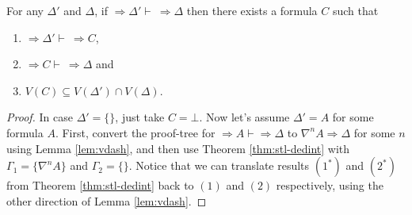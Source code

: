 \begin{cor}\label{cor:stl-dedint} For any $\Delta'$ and $\Delta$, if $\Rightarrow \Delta' \vdash\ \Rightarrow \Delta$ then there exists a formula $C$ such that
	\begin{enumerate}[label=(\arabic*)]
		\item $\Rightarrow \Delta' \vdash\ \Rightarrow C$,
		\item $\Rightarrow C \vdash\ \Rightarrow \Delta$ and
		\item $V(C) \subseteq V(\Delta') \cap V(\Delta)$.
	\end{enumerate}
\end{cor}
\begin{proof}
	In case $\Delta' = \{\}$, just take $C = \bot$. Now let's assume $\Delta' = A$ for some formula $A$. First, convert the proof-tree for $\Rightarrow A \vdash \Rightarrow \Delta$ to $\nabla^n A \Rightarrow \Delta$ for some $n$ using Lemma \ref{lem:vdash}, and then use Theorem \ref{thm:stl-dedint} with $\Gamma_1 = \{\nabla^n A \}$ and $\Gamma_2 = \{\}$. Notice that we can translate results $(\mathit{1}^*)$ and $(\mathit{2}^*)$ from Theorem \ref{thm:stl-dedint} back to $(\mathit{1})$ and $(\mathit{2})$ respectively, using the other direction of Lemma \ref{lem:vdash}.
\end{proof}